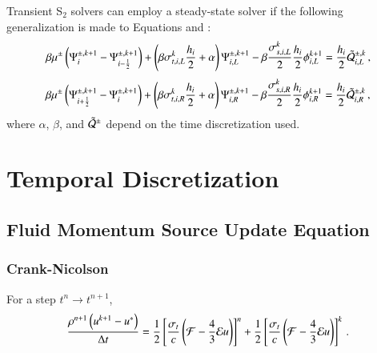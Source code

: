 \documentclass[preprint,12pt]{elsarticle}
\begin{document}
Transient S$_2$ solvers can employ a steady-state solver if
the following generalization is made to Equations 
and :
\begin{equation}\lequ{S2trL}
  \beta\mu^\pm\fn{\Psi^{\pm,k+1}_i - \Psi^{\pm,k+1}_{i-\half}}
  +\fn{\beta\sigma_{t,i,L}^k\frac{h_i}{2} + \alpha}\Psi\iL^{\pm,k+1}
  -\beta\frac{\sigma_{s,i,L}^k}{2}\frac{h_i}{2}\phi\iL^{k+1}
  =\frac{h_i}{2}\tilde{\Q}_{i,L}^{\pm,k} \pec
\end{equation}
\begin{equation}\lequ{S2trR}
  \beta\mu^\pm\fn{\Psi^{\pm,k+1}_{i+\half} - \Psi^{\pm,k+1}_i}
  +\fn{\beta\sigma_{t,i,R}^k\frac{h_i}{2} + \alpha}\Psi\iR^{\pm,k+1}
  -\beta\frac{\sigma_{s,i,R}^k}{2}\frac{h_i}{2}\phi\iR^{k+1}
  =\frac{h_i}{2}\tilde{\Q}_{i,R}^{\pm,k} \pec
\end{equation}
where $\alpha$, $\beta$, and $\tilde{\mathcal{Q}}^\pm$ depend on the time
discretization used.

\section{Temporal Discretization}
\subsection{Fluid Momentum Source Update Equation}
\subsubsection{Crank-Nicolson}
For a step $t^n\rightarrow t^{n+1}$,
\begin{equation}
  \frac{\rho^{n+1}\left(u^{k+1}-u^*\right)}{\Delta t} = 
   \frac{1}{2}\left[\frac{\sigma_{t}}{c}\left(\mathcal{F}-\frac{4}{3}\mathcal{E} u\right)\right]^n
  +\frac{1}{2}\left[\frac{\sigma_{t}}{c}\left(\mathcal{F}-\frac{4}{3}\mathcal{E} u\right)\right]^k
  \, .
\end{equation}
\end{document}

